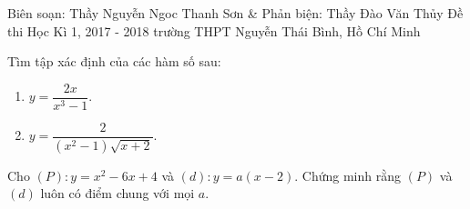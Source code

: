 \begin{name}
{Biên soạn: Thầy Nguyễn Ngoc Thanh Sơn \& Phản biện: Thầy Đào Văn Thủy}
{Đề thi Học Kì 1, 2017 - 2018 trường THPT Nguyễn Thái Bình, Hồ Chí Minh}
\end{name}
\setcounter{ex}{0}\setcounter{bt}{0}

\begin{bt}%
	Tìm tập xác định của các hàm số sau:
	\begin{multicols}{2}
		\begin{enumerate}
			\item $y=\dfrac{2x}{{x^3}-1}$.
			\item $y=\dfrac{2}{({x^2}-1)\sqrt{x+2}}$.
		\end{enumerate}
	\end{multicols}
\end{bt}
\begin{bt}%
	Cho $(P)\colon y=x^2-6x+4$ và $(d)\colon y=a(x-2)$. Chứng minh rằng $(P)$ và $(d)$ luôn có điểm chung với mọi $a$.
\end{bt}
